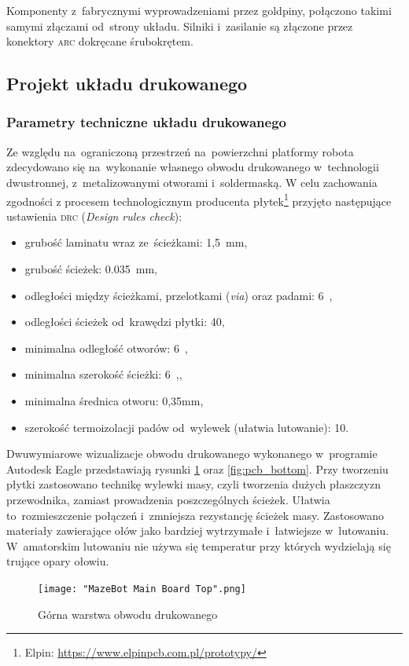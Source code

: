 \documentclass[11pt]{article}
\begin{document}
Komponenty z~fabrycznymi wyprowadzeniami przez goldpiny, połączono takimi samymi złączami od~strony układu.
Silniki i~zasilanie są złączone przez konektory \textsc{arc} dokręcane śrubokrętem.

\subsection{Projekt układu drukowanego}
\subsubsection{Parametry techniczne układu drukowanego}
Ze względu na~ograniczoną przestrzeń na~powierzchni platformy robota zdecydowano się na~wykonanie własnego obwodu drukowanego w~technologii dwustronnej, z~metalizowanymi otworami i~soldermaską.
W celu zachowania zgodności z procesem technologicznym producenta płytek\footnote{Elpin: \url{https://www.elpinpcb.com.pl/prototypy/}}
przyjęto następujące ustawienia \textsc{drc} (\textit{Design rules check}):
\begin{itemize}
	\item grubość laminatu wraz ze~ścieżkami: 1,5~\si{\milli\meter},
	\item grubość ścieżek: 0.035~\si{\milli\meter},
	\item odległości między ścieżkami, przelotkami (\textit{via}) oraz padami: 6~\si{\mil},
	\item odległości ścieżek od~krawędzi płytki: 40\si{\mil},
	\item minimalna odległość otworów: 6~\si{\mil},
	\item minimalna szerokość ścieżki: 6~\si{\mil},,
	\item minimalna średnica otworu: 0,35\si{\milli\meter},
	\item szerokość termoizolacji padów od~wylewek (ułatwia lutowanie): 10\si{\mil}.
\end{itemize}
Dwuwymiarowe wizualizacje obwodu drukowanego wykonanego w~programie Autodesk Eagle przedstawiają rysunki \ref{fig:pcb_top} oraz \ref{fig:pcb_bottom}.
Przy tworzeniu płytki zastosowano technikę wylewki masy, czyli tworzenia dużych płaszczyzn przewodnika, zamiast prowadzenia poszczególnych ścieżek.
Ułatwia to~rozmieszczenie połączeń i~zmniejsza rezystancję ścieżek masy.
Zastosowano materiały zawierające ołów jako bardziej wytrzymałe i~łatwiejsze w~lutowaniu.
W~amatorskim lutowaniu nie używa się temperatur przy których wydzielają się trujące opary ołowiu.

\begin{figure}[!htbp]
	\centering
	\texttt{[image: "MazeBot Main Board Top".png]}
	\caption{Górna warstwa obwodu drukowanego}
	\label{fig:pcb_top}
\end{figure}
\end{document}
